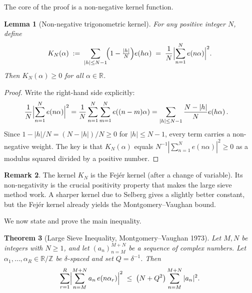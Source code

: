 \documentclass[12pt,a4paper]{amsart}
\newtheorem{theorem}{Theorem}[section]
\newtheorem{lemma}[theorem]{Lemma}
\theoremstyle{definition}
\newtheorem{remark}[theorem]{Remark}
\newcommand{\Z}{\mathbb{Z}}
\newcommand{\R}{\mathbb{R}}
\newcommand{\eexp}[1]{e\!\left(#1\right)}
\begin{document}
The core of the proof is a non-negative kernel function.

\begin{lemma}[Non-negative trigonometric kernel]\label{lem:kernel}
  For any positive integer $N$, define
  \[
    K_N(\alpha)
    \;:=\;
    \sum_{|h| \leq N-1}\!\Bigl(1 - \tfrac{|h|}{N}\Bigr)\eexp{h\alpha}
    \;=\;
    \frac{1}{N}\Bigl|\sum_{n=1}^{N}\eexp{n\alpha}\Bigr|^{2}.
  \]
  Then $K_N(\alpha) \geq 0$ for all $\alpha \in \R$.
\end{lemma}

\begin{proof}
  Write the right-hand side explicitly:
  \begin{align*}
    \frac{1}{N}\Bigl|\sum_{n=1}^{N}\eexp{n\alpha}\Bigr|^{2}
    &= \frac{1}{N}\sum_{n=1}^{N}\sum_{m=1}^{N}\eexp{(n-m)\alpha}
    = \sum_{|h| \leq N-1}\frac{N-|h|}{N}\eexp{h\alpha}.
  \end{align*}
  Since $1 - |h|/N = (N-|h|)/N \geq 0$ for $|h| \leq N-1$, every term
  carries a non-negative weight.  The key is that $K_N(\alpha)$ equals
  $N^{-1}|\sum_{n=1}^{N}\eexp{n\alpha}|^2 \geq 0$ as a modulus squared
  divided by a positive number.
\end{proof}

\begin{remark}
  The kernel $K_N$ is the Fejér kernel (after a change of variable).
  Its non-negativity is the crucial positivity property that makes the
  large sieve method work.  A sharper kernel due to Selberg gives a
  slightly better constant, but the Fejér kernel already yields the
  Montgomery--Vaughan bound.
\end{remark}

We now state and prove the main inequality.

\begin{theorem}[Large Sieve Inequality, Montgomery--Vaughan 1973]%
  \label{thm:large_sieve}
  Let $M, N$ be integers with $N \geq 1$, and let $(a_n)_{n=M}^{M+N}$ be
  a sequence of complex numbers.  Let $\alpha_1, \ldots, \alpha_R \in \R/\Z$
  be $\delta$-spaced and set $Q = \delta^{-1}$.  Then
  \[
    \sum_{r=1}^{R}\Bigl|\sum_{n=M}^{M+N} a_n\,\eexp{n\alpha_r}\Bigr|^{2}
    \;\leq\;
    \bigl(N + Q^{2}\bigr)\sum_{n=M}^{M+N}|a_n|^{2}.
  \]
\end{theorem}
\end{document}
